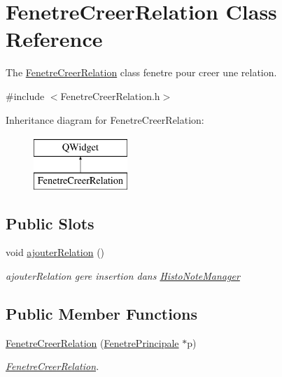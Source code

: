 \hypertarget{class_fenetre_creer_relation}{}\section{Fenetre\+Creer\+Relation Class Reference}
\label{class_fenetre_creer_relation}


The \hyperlink{class_fenetre_creer_relation}{Fenetre\+Creer\+Relation} class fenetre pour creer une relation.  




{\ttfamily \#include $<$Fenetre\+Creer\+Relation.\+h$>$}

Inheritance diagram for Fenetre\+Creer\+Relation\+:\begin{figure}[H]
\begin{center}
\leavevmode
\includegraphics[height=2.000000cm]{class_fenetre_creer_relation}
\end{center}
\end{figure}
\subsection*{Public Slots}
\begin{DoxyCompactItemize}
\item 
\mbox{\label{class_fenetre_creer_relation_a675a698684b3199f49ac3e51b34c9b30}} 
void \hyperlink{class_fenetre_creer_relation_a675a698684b3199f49ac3e51b34c9b30}{ajouter\+Relation} ()
\begin{DoxyCompactList}\small\item\em ajouter\+Relation gere insertion dans \hyperlink{class_histo_note_manager}{Histo\+Note\+Manager} \end{DoxyCompactList}\end{DoxyCompactItemize}
\subsection*{Public Member Functions}
\begin{DoxyCompactItemize}
\item 
\hyperlink{class_fenetre_creer_relation_ae9f3e3635ed7130fa00c215a1d0454ec}{Fenetre\+Creer\+Relation} (\hyperlink{class_fenetre_principale}{Fenetre\+Principale} $\ast$p)
\begin{DoxyCompactList}\small\item\em \hyperlink{class_fenetre_creer_relation}{Fenetre\+Creer\+Relation}. \end{DoxyCompactList}\end{DoxyCompactItemize}


